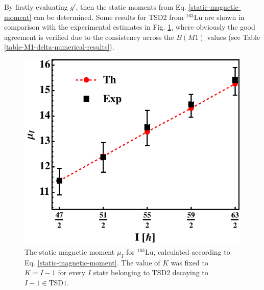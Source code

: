 By firstly evaluating $g'$, then the static moments from Eq. \ref{static-magnetic-moment} can be determined. Some results for TSD2 from $^{163}$Lu are shown in comparison with the experimental estimates in Fig. \ref{muI-static-magnetic-moment}, where obviously the good agreement is verified due to the consistency across the $B(M1)$ values (see Table \ref{table-M1-delta-numerical-results}).
\begin{figure}
    \centering
    \includegraphics[scale=0.75]{Chapters/Figures/static-muI.pdf}
    \caption{The static magnetic moment $\mu_I$ for $^{163}$Lu, calculated according to Eq. \ref{static-magnetic-moment}. The value of $K$ was fixed to $K=I-1$ for every $I$ state belonging to TSD2 decaying to $I-1\in\text{TSD1}$.}
    \label{muI-static-magnetic-moment}
\end{figure}

